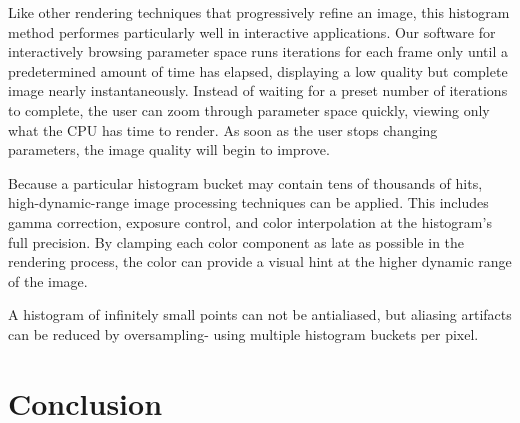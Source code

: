 \documentclass{acmsiggraph}
\begin{document}
Like other rendering techniques that progressively refine an image, this
histogram method performes particularly well in interactive applications.
Our software for interactively browsing parameter space runs iterations
for each frame only until a predetermined amount of time has elapsed,
displaying a low quality but complete image nearly instantaneously.
Instead of waiting for a preset number of iterations to complete, the user
can zoom through parameter space quickly, viewing only what the CPU has time
to render. As soon as the user stops changing parameters, the image quality
will begin to improve.

Because a particular histogram bucket may contain tens of thousands of hits,
high-dynamic-range image processing techniques can be applied. This includes
gamma correction, exposure control, and color interpolation at the histogram's
full precision. By clamping each color component as late as possible in the
rendering process, the color can provide a visual hint at the higher
dynamic range of the image.

A histogram of infinitely small points can not be antialiased, but aliasing
artifacts can be reduced by oversampling- using multiple histogram buckets
per pixel.


\section{Conclusion}
\end{document}
